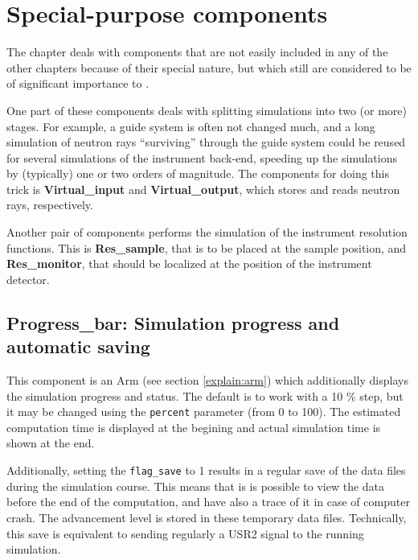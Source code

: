 \chapter{Special-purpose components}

The chapter deals with components that are not easily included
in any of the other chapters because of their special nature,
but which still are considered to be of significant importance
to \MCS .

One part of these components deals with splitting simulations
into two (or more) stages. For example, a guide system is often
not changed much, and a long simulation of neutron rays
``surviving'' through the guide system could be reused
for several simulations of the instrument back-end, speeding up
the simulations by (typically) one or two orders of magnitude.
The components for doing this trick is {\bf Virtual\_input} and
{\bf Virtual\_output}, which stores and reads neutron rays, respectively.

Another pair of components performs the simulation of the instrument
resolution functions. This is {\bf Res\_sample}, that is to be
placed at the sample position, and {\bf Res\_monitor}, that should
be localized at the position of the instrument detector.

\newpage



\newpage



\newpage
\section{Progress\_bar: Simulation progress and automatic saving}
\label{s:progress-bar}

This component is an Arm (see section \ref{explain:arm}) which additionally displays the simulation progress and status. The default is to work with a 10 \% step, but it may be changed using the \verb+percent+ parameter (from 0 to 100). The estimated computation time is displayed at the begining and actual simulation time is shown at the end.

Additionally, setting the \verb+flag_save+ to 1 results in a regular save of the data files during the simulation course. This means that is is possible to view the data before the end of the computation, and have also a trace of it in case of computer crash. The advancement level is stored in these temporary data files. Technically, this save is equivalent to sending regularly a USR2 signal to the running simulation.
